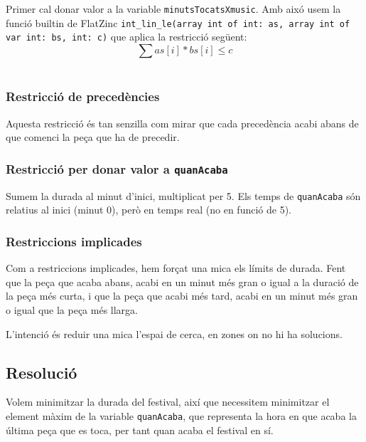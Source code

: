\documentclass[11pt,a4paper,twoside]{report}
\begin{document}
Primer cal donar valor a la variable \texttt{minutsTocatsXmusic}. Amb aixó usem la funció builtin de FlatZinc 
\texttt{int\_lin\_le(array int of int: as, array int of var int: bs, int: c)} que aplica la restricció següent:
\[
    \sum as[i] * bs[i] \leq c
\]
~\\


\subsubsection*{Restricció de precedències}

Aquesta restricció és tan senzilla com mirar que cada precedència acabi abans de que comenci la peça que ha de precedir.
~\\



\subsubsection*{Restricció per donar valor a \texttt{quanAcaba}}
Sumem la durada al minut d'inici, multiplicat per 5. Els temps de \texttt{quanAcaba} són relatius al inici (minut 0), però en temps real (no en funció de 5).
~\\



\subsubsection*{Restriccions implicades}
Com a restriccions implicades, hem forçat una mica els límits de durada. 
Fent que la peça que acaba abans, acabi en un minut més gran o igual a la duració de la peça més curta, 
i que la peça que acabi més tard, acabi en un minut més gran o igual que la peça més llarga.

L'intenció és reduir una mica l'espai de cerca, en zones on no hi ha solucions. \\


\subsection{Resolució}

Volem minimitzar la durada del festival, així que necessitem minimitzar el element màxim de la variable \texttt{quanAcaba}, que representa la hora en que acaba la última peça que es toca, per tant quan acaba el festival en sí. \\

\end{document}

